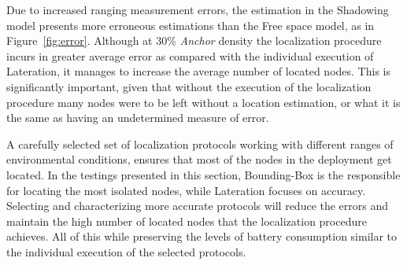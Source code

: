 Due to increased ranging measurement errors, the estimation in the Shadowing model presents more erroneous estimations than the Free space model, as in Figure~\ref{fig:error}. Although at $30$\% \emph{Anchor} density the localization procedure incurs in greater average error as compared with the individual execution of Lateration, it manages to increase the average number of located nodes. This is significantly important, given that without the execution of the localization procedure many nodes were to be left without a location estimation, or what it is the same as having an undetermined measure of error.


A carefully selected set of localization protocols working with different ranges of environmental conditions, ensures that most of the nodes in the deployment get located. In the testings presented in this section, Bounding-Box is the responsible for locating the most isolated nodes, while Lateration focuses on accuracy. Selecting and characterizing more accurate protocols will reduce the errors and maintain the high number of located nodes that the localization procedure achieves. All of this while preserving the levels of battery consumption similar to the individual execution of the selected protocols.

